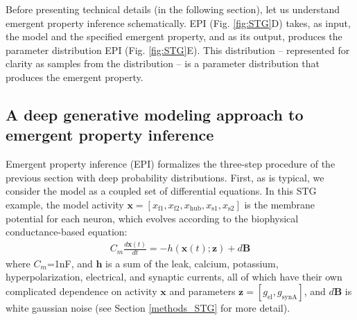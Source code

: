 \documentclass[11pt]{article}
\begin{document}
Before presenting technical details (in the following section), let us understand emergent property inference schematically.
EPI (Fig. \ref{fig:STG}D) takes, as input, the model and the specified emergent property, and as its output, produces the parameter distribution  EPI (Fig. \ref{fig:STG}E).  
This distribution -- represented for clarity as samples from the distribution -- is a parameter distribution that produces the emergent property. 

\subsection{A deep generative modeling approach to emergent property inference} \label{results_dgm}
Emergent property inference (EPI) formalizes the three-step procedure of the previous section with deep probability distributions.
First, as is typical, we consider the model as a coupled set of differential equations.  
In this STG example, the model activity $\mathbf{x} = \left[ x_{\text{f1}}, x_{\text{f2}}, x_{\text{hub}}, x_{\text{s1}}, x_{\text{s2}} \right]$ is the membrane potential for each neuron, which evolves according to the biophysical conductance-based equation:
\begin{equation} 
\begin{split}
C_m \frac{d\mathbf{x}(t)}{dt} = -h(\mathbf{x}(t); \mathbf{z}) + d\mathbf{B}
 \end{split}
\end{equation} 
where $C_m$=1nF, and $\mathbf{h}$ is a sum of the leak, calcium, potassium, hyperpolarization, electrical, and synaptic currents, all of which have their own complicated dependence on activity $\mathbf{x}$ and parameters $\mathbf{z} = [g_{\text{el}}, g_{\text{synA}}]$, and $d\mathbf{B}$ is white gaussian noise \cite{morris1981voltage, gutierrez2013multiple} (see Section \ref{methods_STG} for more detail).
\end{document}
